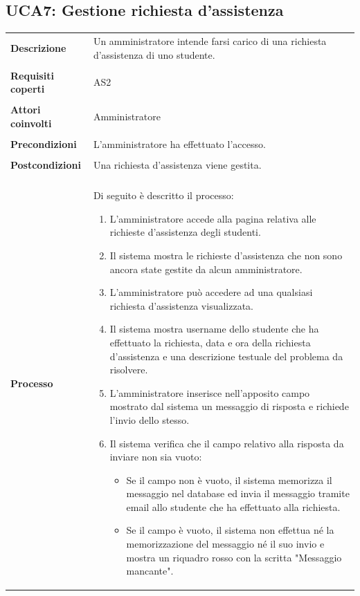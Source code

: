 \documentclass[10pt,a4paper]{report}
\begin{document}
	\subsection{UCA7: Gestione richiesta d'assistenza}
	\begin{tabular}{lp{}}
		\textbf{Descrizione}&Un amministratore intende farsi carico di una richiesta d'assistenza di uno studente.\\
		\\
		\textbf{Requisiti coperti}&AS2\\
		\\
		\textbf{Attori coinvolti}&Amministratore\\
		\\
		\textbf{Precondizioni}&L'amministratore ha effettuato l'accesso.\\
		\\
		\textbf{Postcondizioni}&Una richiesta d'assistenza viene gestita.\\
		\\
		\textbf{Processo}&Di seguito è descritto il processo:
		\begin{enumerate}
			\item L'amministratore accede alla pagina relativa alle richieste d'assistenza degli studenti.
			\item Il sistema mostra le richieste d'assistenza che non sono ancora state gestite da alcun amministratore.
			\item L'amministratore può accedere ad una qualsiasi richiesta d'assistenza visualizzata.
			\item Il sistema mostra username dello studente che ha effettuato la richiesta, data e ora della richiesta d'assistenza e una descrizione testuale del problema da risolvere.
			\item L'amministratore inserisce nell'apposito campo mostrato dal sistema un messaggio di risposta e richiede l'invio dello stesso.
			\item Il sistema verifica che il campo relativo alla risposta da inviare non sia vuoto:
			\begin{itemize}
				\item Se il campo non è vuoto, il sistema memorizza il messaggio nel database ed invia il messaggio tramite email allo studente che ha effettuato alla richiesta.
				\item Se il campo è vuoto, il sistema non effettua né la memorizzazione del messaggio né il suo invio e mostra un riquadro rosso con la scritta "Messaggio mancante".
			\end{itemize}
		\end{enumerate}
	\end{tabular}
\end{document}
